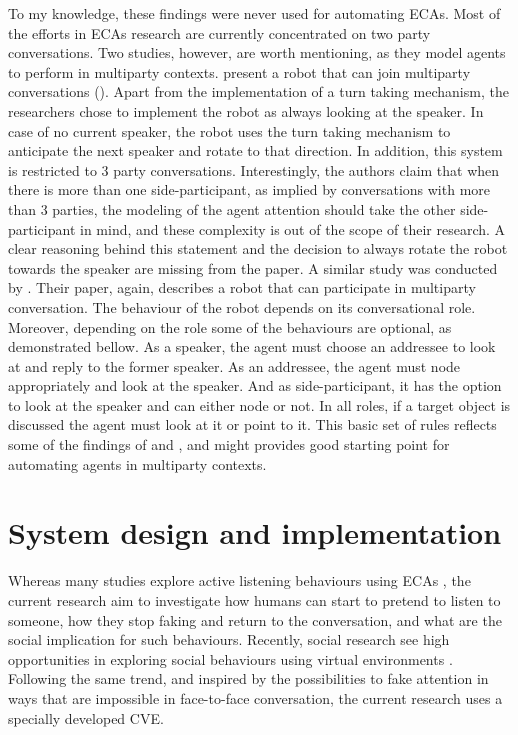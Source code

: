 \documentclass[]{simple-thesis}
\begin{document}
To my knowledge, these findings were never used for automating ECAs.
Most of the efforts in ECAs research are currently concentrated on two party conversations.
Two studies, however, are worth mentioning, as they model agents to perform in multiparty contexts.
\citeauthor{Matsusaka2001} present a robot that can join multiparty conversations (\citeyear{Matsusaka2001}).
Apart from the implementation of a turn taking mechanism, the researchers chose to implement the robot as always looking at the speaker.
In case of no current speaker, the robot uses the turn taking mechanism to anticipate the next speaker and rotate to that direction.
In addition, this system is restricted to 3 party conversations.
Interestingly, the authors claim that when there is more than one side-participant, as implied by conversations with more than 3 parties, the modeling of the agent attention should take the other side-participant in mind, and these complexity is out of the scope of their research.
A clear reasoning behind this statement and the decision to always rotate the robot towards the speaker are missing from the paper.
A similar study was conducted by \cite{Fujie2009}.
Their paper, again, describes a robot that can participate in multiparty conversation.
The behaviour of the robot depends on its conversational role.
Moreover, depending on the role some of the behaviours are optional, as demonstrated bellow.
As a speaker, the agent must choose an addressee to look at and reply to the former speaker.
As an addressee, the agent must node appropriately and look at the speaker.
And as side-participant, it has the option to look at the speaker and can either node or not.
In all roles, if a target object is discussed the agent must look at it or point to it.
This basic set of rules reflects some of the findings of \cite{Healey2009} and \cite{Battersby2010}, and might provides good starting point for automating agents in multiparty contexts.


\chapter{System design and implementation}\label{system_design_and_implementation}

Whereas many studies explore active listening behaviours using ECAs \citep{Nishimura2007, Bevacqua2008, Gratch2007, Huang2011, Lee2006, Poppe2013}, the current research aim to investigate how humans can start to pretend to listen to someone, how they stop faking and return to the conversation, and what are the social implication for such behaviours.
Recently, social research see high opportunities in exploring social behaviours using virtual environments \citep{Loomis1999}.
Following the same trend, and inspired by the possibilities to fake attention in ways that are impossible in face-to-face conversation, the current research uses a specially developed CVE.
\end{document}
